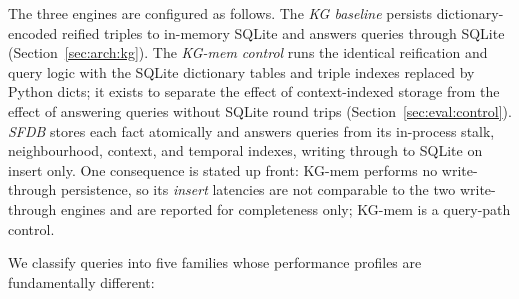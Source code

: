 The three engines are configured as follows. The \emph{KG baseline}
persists dictionary-encoded reified triples to in-memory SQLite and
answers queries through SQLite (Section~\ref{sec:arch:kg}). The
\emph{KG-mem control} runs the identical reification and query logic with
the SQLite dictionary tables and triple indexes replaced by Python dicts;
it exists to separate the effect of context-indexed storage from the
effect of answering queries without SQLite round trips
(Section~\ref{sec:eval:control}). \emph{SFDB} stores each fact atomically
and answers queries from its in-process stalk, neighbourhood, context,
and temporal indexes, writing through to SQLite on insert only. One
consequence is stated up front: KG-mem performs no write-through
persistence, so its \emph{insert} latencies are not comparable to the two
write-through engines and are reported for completeness only; KG-mem is a
query-path control.

We classify queries into five families whose performance profiles are
fundamentally different:

